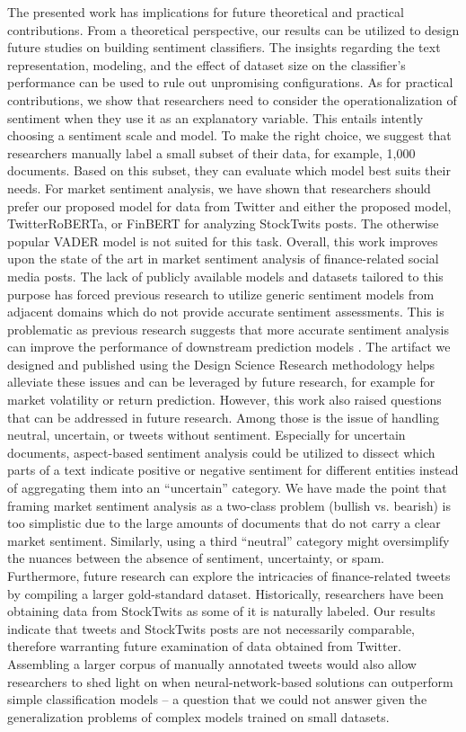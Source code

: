 The presented work has implications for future theoretical and practical contributions. From a theoretical perspective, our results can be utilized to design future studies on building sentiment classifiers. The insights regarding the text representation, modeling, and the effect of dataset size on the classifier's performance can be used to rule out unpromising configurations.
 As for practical contributions, we show that researchers need to consider the operationalization of sentiment when they use it as an explanatory variable. This entails intently choosing a sentiment scale and model. To make the right choice, we suggest that researchers manually label a small subset of their data, for example, 1,000 documents. Based on this subset, they can evaluate which model best suits their needs. For market sentiment analysis, we have shown that researchers should prefer our proposed model for data from Twitter and either the proposed model, TwitterRoBERTa, or FinBERT for analyzing StockTwits posts. The otherwise popular VADER model is not suited for this task.\newline
Overall, this work improves upon the state of the art in market sentiment analysis of finance-related social media posts. The lack of publicly available models and datasets tailored to this purpose has forced previous research to utilize generic sentiment models from adjacent domains which do not provide accurate sentiment assessments. This is problematic as previous research suggests that more accurate sentiment analysis can improve the performance of downstream prediction models . The artifact we designed and published using the Design Science Research methodology helps alleviate these issues and can be leveraged by future research, for example for market volatility or return prediction.\newline
However, this work also raised questions that can be addressed in future research. Among those is the issue of handling neutral, uncertain, or tweets without sentiment. Especially for uncertain documents, aspect-based sentiment analysis could be utilized to dissect which parts of a text indicate positive or negative sentiment for different entities instead of aggregating them into an ``uncertain'' category. We have made the point that framing market sentiment analysis as a two-class problem (bullish vs. bearish) is too simplistic due to the large amounts of documents that do not carry a clear market sentiment. Similarly, using a third ``neutral'' category might oversimplify the nuances between the absence of sentiment, uncertainty, or spam.
Furthermore, future research can explore the intricacies of finance-related tweets by compiling a larger gold-standard dataset. Historically, researchers have been obtaining data from StockTwits as some of it is naturally labeled. Our results indicate that tweets and StockTwits posts are not necessarily comparable, therefore warranting future examination of data obtained from Twitter. Assembling a larger corpus of manually annotated tweets would also allow researchers to shed light on when neural-network-based solutions can outperform simple classification models -- a question that we could not answer given the generalization problems of complex models trained on small datasets.

